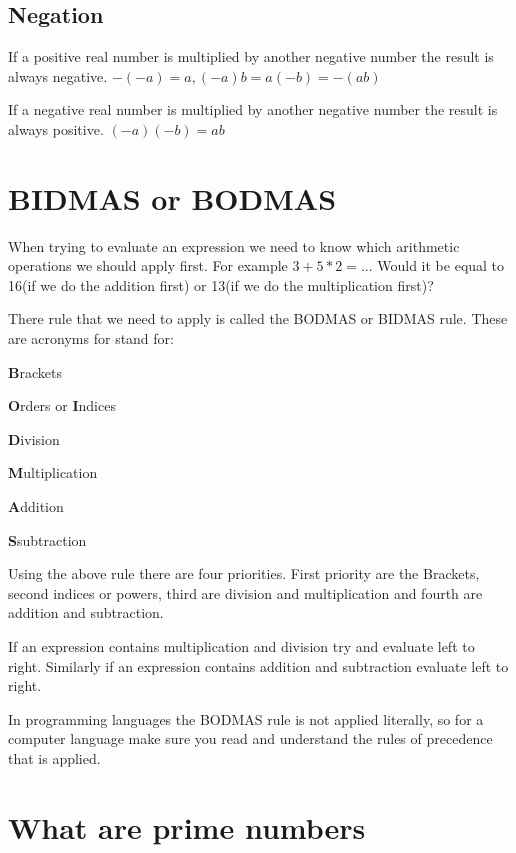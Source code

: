 \documentclass[
]{book}
\begin{document}
\hypertarget{negation}{%
\subsection{Negation}\label{negation}}

If a positive real number is multiplied by another negative number the result is always negative.
\(-(-a) = a, (-a)b= a(-b) = -(ab)\)

If a negative real number is multiplied by another negative number the result is always positive.
\((-a)(-b) = ab\)

\hypertarget{bidmas-or-bodmas}{%
\section{BIDMAS or BODMAS}\label{bidmas-or-bodmas}}

When trying to evaluate an expression we need to know which arithmetic operations we should apply first.
For example
\(3+5*2=...\)
Would it be equal to 16(if we do the addition first) or 13(if we do the multiplication first)?

There rule that we need to apply is called the BODMAS or BIDMAS rule. These are acronyms for stand for:

\textbf{B}rackets

\textbf{O}rders or \textbf{I}ndices

\textbf{D}ivision

\textbf{M}ultiplication

\textbf{A}ddition

\textbf{S}subtraction

Using the above rule there are four priorities. First priority are the Brackets, second indices or powers, third are division and multiplication and fourth are addition and subtraction.

If an expression contains multiplication and division try and evaluate left to right.
Similarly if an expression contains addition and subtraction evaluate left to right.

In programming languages the BODMAS rule is not applied literally, so for a computer language make sure you read and understand the rules of precedence that is applied.

\hypertarget{what-are-prime-numbers}{%
\section{What are prime numbers}\label{what-are-prime-numbers}}
\end{document}
